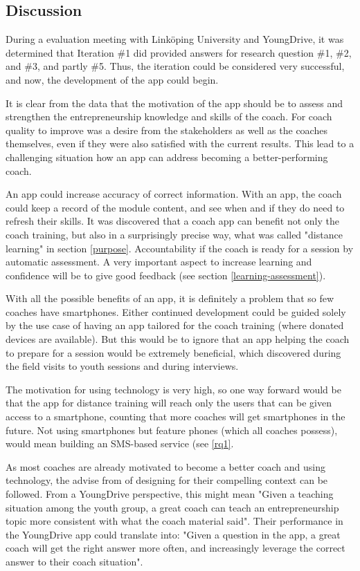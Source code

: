 \subsection{Discussion}

During a evaluation meeting with Linköping University and YoungDrive, it was determined that Iteration \#1 did provided answers for research question \#1, \#2, and \#3, and partly \#5. Thus, the iteration could be considered very successful, and now, the development of the app could begin.

It is clear from the data that the motivation of the app should be to assess and strengthen the entrepreneurship knowledge and skills of the coach. For coach quality to improve was a desire from the stakeholders as well as the coaches themselves, even if they were also satisfied with the current results. This lead to a challenging situation how an app can address becoming a better-performing coach.

An app could increase accuracy of correct information. With an app, the coach could keep a record of the module content, and see when and if they do need to refresh their skills. It was discovered that a coach app can benefit not only the coach training, but also in a surprisingly precise way, what was called "distance learning" in section \ref{purpose}. Accountability if the coach is ready for a session by automatic assessment. A very important aspect to increase learning and confidence will be to give good feedback (see section \ref{learning-assessment}).

With all the possible benefits of an app, it is definitely a problem that so few coaches have smartphones. Either continued development could be guided solely by the use case of having an app tailored for the coach training (where donated devices are available). But this would be to ignore that an app helping the coach to prepare for a session would be extremely beneficial, which discovered during the field visits to youth sessions and during interviews.

The motivation for using technology is very high, so one way forward would be that the app for distance training will reach only the users that can be given access to a smartphone, counting that more coaches will get smartphones in the future. Not using smartphones but feature phones (which all coaches possess), would mean building an SMS-based service (see \ref{rq1}.

As most coaches are already motivated to become a better coach and using technology, the advise from \cite{sierra} of designing for their compelling context can be followed. From a YoungDrive perspective, this might mean "Given a teaching situation among the youth group, a great coach can teach an entrepreneurship topic more consistent with what the coach material said". Their performance in the YoungDrive app could translate into: "Given a question in the app, a great coach will get the right answer more often, and increasingly leverage the correct answer to their coach situation".

